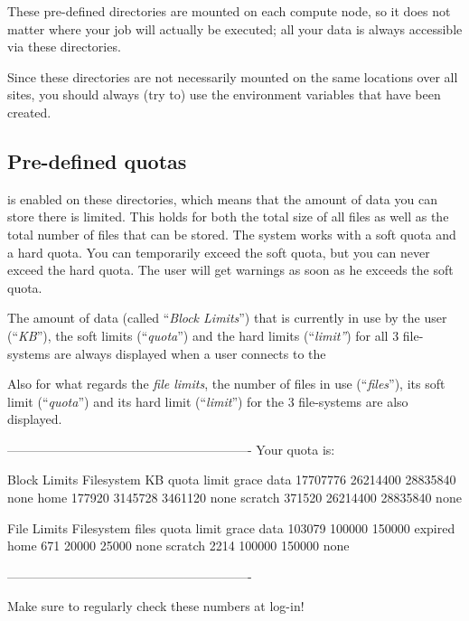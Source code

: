 These pre-defined directories are mounted on each compute node, so it does not
matter where your job will actually be executed; all your data is always
accessible via these directories.

Since these directories are not necessarily mounted on the same locations over
all sites, you should always (try to) use the environment variables that have
been created.

\subsection{Pre-defined quotas}

 is enabled on these directories, which means that the amount of
data you can store there is limited. This holds for both the total size of all
files as well as the total number of files that can be stored. The system works
with a soft quota and a hard quota. You can temporarily exceed the soft quota,
but you can never exceed the hard quota. The user will get warnings as soon as
he exceeds the soft quota.

The amount of data (called ``\emph{Block Limits}'') that is currently in use
by the user (``\emph{KB}''), the soft limits (``\emph{quota}'') and the
hard limits (``\emph{limit''}) for all 3 file-systems are always displayed
when a user connects to the \hpc

 Also for what regards the \emph{file limits}, the number of files in use
 (``\emph{files}''), its soft limit (``\emph{quota}'') and its hard limit
 (``\emph{limit}'') for the 3 file-systems are also displayed.

\begin{prompt}
----------------------------------------------------------
Your quota is:

                   Block Limits
   Filesystem         KB      quota      limit    grace
   data         17707776   26214400   28835840     none
   home           177920    3145728    3461120     none
   scratch        371520   26214400   28835840     none

                File Limits
   Filesystem      files      quota      limit    grace
   data           103079     100000     150000  expired
   home              671      20000      25000     none
   scratch          2214     100000     150000     none

----------------------------------------------------------
\end{prompt}
Make sure to regularly check these numbers at log-in!

